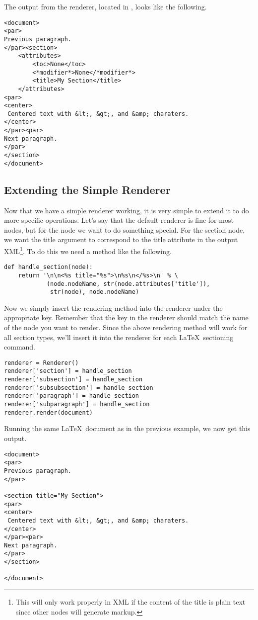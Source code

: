The output from the renderer, located in , looks like the
following.
\begin{verbatim}
<document>
<par>
Previous paragraph.
</par><section>
    <attributes>
        <toc>None</toc>
        <*modifier*>None</*modifier*>
        <title>My Section</title>
    </attributes>
<par>
<center>
 Centered text with &lt;, &gt;, and &amp; charaters.
</center>
</par><par>
Next paragraph.
</par>
</section>
</document>
\end{verbatim}


\subsection{Extending the Simple Renderer}

Now that we have a simple renderer working, it is very simple to extend
it to do more specific operations.  Let's say that the default renderer
is fine for most nodes, but for the  node we want to do
something special.  For the section node, we want the title argument
to correspond to the title attribute in the output XML\footnote{This
will only work properly in XML if the content of the title is plain text
since other nodes will generate markup.}.  To do this we need a
method like the following.
\begin{verbatim}
def handle_section(node):
    return '\n\n<%s title="%s">\n%s\n</%s>\n' % \
            (node.nodeName, str(node.attributes['title']),
             str(node), node.nodeName)
\end{verbatim}

Now we simply insert the rendering method into the renderer under the
appropriate key.  Remember that the key in the renderer should match
the name of the node you want to render.  Since the above rendering
method will work for all section types, we'll insert it into the
renderer for each \LaTeX\ sectioning command.
\begin{verbatim}
renderer = Renderer()
renderer['section'] = handle_section
renderer['subsection'] = handle_section
renderer['subsubsection'] = handle_section
renderer['paragraph'] = handle_section
renderer['subparagraph'] = handle_section
renderer.render(document)
\end{verbatim}

Running the same \LaTeX\ document as in the previous example, we now get
this output.
\begin{verbatim}
<document>
<par>
Previous paragraph.
</par>

<section title="My Section">
<par>
<center>
 Centered text with &lt;, &gt;, and &amp; charaters.
</center>
</par><par>
Next paragraph.
</par>
</section>

</document>
\end{verbatim}


